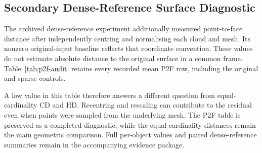 \subsection{Secondary Dense-Reference Surface Diagnostic}
\label{sec:geometry-audit}
The archived dense-reference experiment additionally measured point-to-face
distance after independently centring and normalising each cloud and mesh.
Its nonzero original-input baseline reflects that coordinate convention.
These values do not estimate absolute distance to the original surface
in a common frame. Table~\ref{tab:p2f-audit} retains every recorded mean
P2F row, including the original and sparse controls.

A low value in this table therefore answers a different question from
equal-cardinality CD and HD. Recentring and rescaling can contribute to
the residual even when points were sampled from the underlying mesh.
The P2F table is preserved as a completed diagnostic, while the
equal-cardinality distances remain the main geometric comparison.
Full per-object values and paired dense-reference summaries remain in
the accompanying evidence package.

